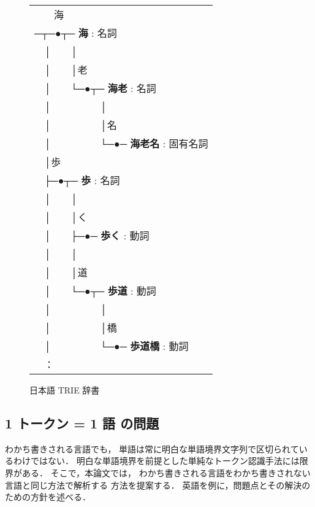 \begin{figure}[bt]
\begin{center}
\renewcommand{\arraystretch}{}
\begin{tabular}{l}
　　海　\\
─┬─●┬─ {\bf  海} : 名詞\\
　│　　│　　\\
　│　　│老　　\\
　│　　└─●┬─ {\bf  海老} : 名詞\\
　│　　　　　│\\
　│　　　　　│名\\
　│　　　　　└─●─ {\bf  海老名} : 固有名詞\\
　│歩　\\
　├─●┬─ {\bf  歩} : 名詞\\
　│　　│\\
　│　　│く\\
　│　　├─●─ {\bf  歩く} : 動詞\\
　│　　│\\
　│　　│道\\
　│　　└─●┬─ {\bf  歩道} : 動詞\\
　│　　　　　│\\
　│　　　　　│橋\\
　│　　　　　└─●─ {\bf  歩道橋} : 動詞\\
　：\\
\end{tabular}
\end{center}
  \caption{日本語 TRIE 辞書}
  \label{fig:trieJ}
\end{figure}


\subsection{1 トークン = 1 語 の問題}\label{1t=1l}

わかち書きされる言語でも，
単語は常に明白な単語境界文字列で区切られているわけではない．
明白な単語境界を前提とした単純なトークン認識手法には限界がある．
そこで，本論文では，
わかち書きされる言語をわかち書きされない言語と同じ方法で解析する
方法を提案する．
英語を例に，問題点とその解決のための方針を述べる．

